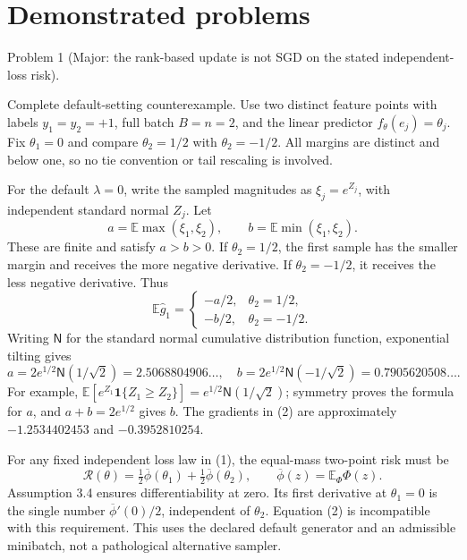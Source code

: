 \documentclass[10pt]{article}
\begin{document}
\section*{Demonstrated problems}
Problem 1 (Major: the rank-based update is not SGD on the stated independent-loss risk).\par
Complete default-setting counterexample. Use two distinct feature points with labels \(y_1=y_2=+1\), full batch \(B=n=2\), and the linear predictor \(f_\theta(e_j)=\theta_j\). Fix \(\theta_1=0\) and compare \(\theta_2=1/2\) with \(\theta_2=-1/2\). All margins are distinct and below one, so no tie convention or tail rescaling is involved.\par
For the default \(\lambda=0\), write the sampled magnitudes as \(\xi_j=e^{Z_j}\), with independent standard normal \(Z_j\). Let \[a=\mathbb E\max(\xi_1,\xi_2),\qquad
 b=\mathbb E\min(\xi_1,\xi_2).\] These are finite and satisfy \(a>b>0\). If \(\theta_2=1/2\), the first sample has the smaller margin and receives the more negative derivative. If \(\theta_2=-1/2\), it receives the less negative derivative. Thus \[\mathbb E\widehat g_1=
 \begin{cases}
 -a/2,&\theta_2=1/2,\\
 -b/2,&\theta_2=-1/2.
 \end{cases}
 \tag{2}\] Writing \(\mathsf N\) for the standard normal cumulative distribution function, exponential tilting gives \[a=2e^{1/2}\mathsf N(1/\sqrt2)=2.5068804906\ldots,\quad
 b=2e^{1/2}\mathsf N(-1/\sqrt2)=0.7905620508\ldots.\] For example, \(\mathbb E[e^{Z_1}\mathbf1\{Z_1\ge Z_2\}]
=e^{1/2}\mathsf N(1/\sqrt2)\); symmetry proves the formula for \(a\), and \(a+b=2e^{1/2}\) gives \(b\). The gradients in (2) are approximately \(-1.2534402453\) and \(-0.3952810254\).\par
For any fixed independent loss law in (1), the equal-mass two-point risk must be \[\mathcal R(\theta)=\tfrac12\overline\phi(\theta_1)
                    +\tfrac12\overline\phi(\theta_2),
 \qquad\overline\phi(z)=\mathbb E_\Phi\Phi(z).\] Assumption 3.4 ensures differentiability at zero. Its first derivative at \(\theta_1=0\) is the single number \(\overline\phi'(0)/2\), independent of \(\theta_2\). Equation (2) is incompatible with this requirement. This uses the declared default generator and an admissible minibatch, not a pathological alternative sampler.\par
\end{document}
